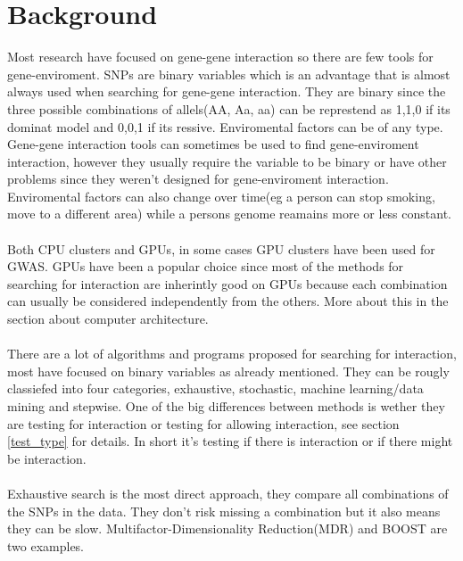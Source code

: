 \documentclass[10pt,a4paper]{article}
\begin{document}
\section{Background}
Most research have focused on gene-gene interaction so there are few tools for gene-enviroment. SNPs are binary variables which is an advantage that is almost always used when searching for gene-gene interaction. They are binary since the three possible combinations of allels(AA, Aa, aa)  can be represtend as 1,1,0 if its dominat model and 0,0,1 if its ressive\cite{}. Enviromental factors can be of any type\cite{gene_enviroment_2013}. Gene-gene interaction tools can sometimes be used to find gene-enviroment interaction, however they usually require the variable to be binary or have other problems since they weren't designed for gene-enviroment interaction. Enviromental factors can also change over time(eg a person can stop smoking, move to a different area) while a persons genome reamains more or less constant.\cite{gene_enviroment_2013}\\
\\
Both CPU clusters\cite{biforce} and GPUs\cite{gwis,gboost,gmdr_gpu,cuda_lr,genie_2012,plink_gpu}, in some cases GPU clusters\cite{} have been used for GWAS. GPUs have been a popular choice since most of the methods for searching for interaction are inherintly good on GPUs because each combination can usually be considered independently from the others. More about this in the section about computer architecture.\\
\\
There are a lot of algorithms and programs proposed for searching for interaction, most have focused on binary variables as already mentioned. They can be rougly classiefed into four categories, exhaustive, stochastic, machine learning/data mining and stepwise\cite{fast_high_order_cluster}. One of the big differences between methods is wether they are testing for interaction or testing for allowing interaction, see section \ref{test_type} for details. In short it's testing if there is interaction or if there might be interaction.\\
\\
Exhaustive search is the most direct approach, they compare all combinations of the SNPs in the data. They don't risk missing a combination but it also means they can be slow. Multifactor-Dimensionality Reduction(MDR)\cite{mdr_2001} and BOOST\cite{boost_gene_gene} are two examples.\\
\end{document}
